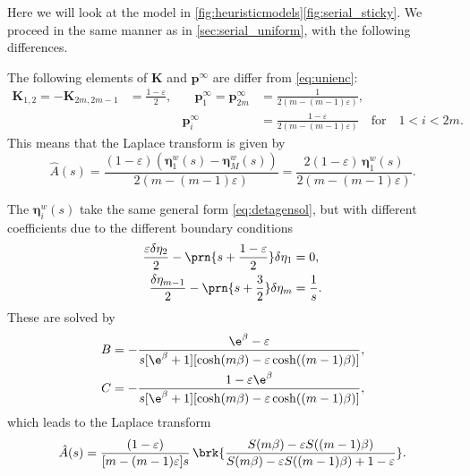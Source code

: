 \documentclass[12pt]{article}
\newcommand{\pr}{\mathbf{p}}
\newcommand{\eq}{\pr^\infty}
\newcommand{\etw}{\boldsymbol{\eta}^w}
\newcommand{\enc}{\mathbf{K}}
\begin{document}
Here we will look at the model in \autoref{fig:heuristicmodels}\ref{fig:serial_sticky}.
We proceed in the same manner as in \autoref{sec:serial_uniform}, with the following differences.

The following elements of $\enc$ and $\eq$ are differ from \eqref{eq:unienc}:
%
\begin{equation}\label{eq:stickyenc}
  \begin{aligned}
  \enc_{1,2} = -\enc_{2m,2m-1} &= \frac{1-\varepsilon}{2},
  &\quad
  \eq_1 = \eq_{2m} &= \frac{1}{2(m-(m-1)\varepsilon)},
  \\ &&
  \eq_i &=  \frac{1-\varepsilon}{2(m-(m-1)\varepsilon)}
  \quad\text{for}\quad 1<i<2m.
  \end{aligned}
\end{equation}
%
This means that the Laplace transform is given by
%
\begin{equation}\label{eq:stickyareaeta}
  \hat{A}(s) = \frac{(1-\varepsilon)(\etw_1(s)-\etw_M(s))}
                    {2(m-(m-1)\varepsilon)}
       = \frac{2(1-\varepsilon)\, \etw_1(s)}{2(m-(m-1)\varepsilon)}.
\end{equation}
%

The $\etw_i(s)$ take the same general form \eqref{eq:detagensol}, but with different coefficients due to the different boundary conditions
%
\begin{equation}\label{eq:detabndsticky}
\begin{aligned}
  \frac{\varepsilon\delta\eta_2}{2} - \prn{s+\frac{1-\varepsilon}{2}}\delta\eta_1 &= 0, \\
  \frac{\delta\eta_{m-1}}{2} - \prn{s+\frac{3}{2}}\delta\eta_{m} &= \frac{1}{s}.
\end{aligned}
\end{equation}
%
These are solved by
%
\begin{equation}\label{eq:stickycoeffs}
\begin{aligned}
  B &= -\frac{\e^{\beta} - \varepsilon}
      {s [\e^{\beta} + 1] [\cosh(m\beta) - \varepsilon \cosh((m-1)\beta)]}, \\
  C &= -\frac{1 - \varepsilon\e^{\beta}}
      {s [\e^{\beta} + 1] [\cosh(m\beta) - \varepsilon \cosh((m-1)\beta)]},
\end{aligned}
\end{equation}
%
which leads to the Laplace transform
%
\begin{equation}\label{eq:stickylaplace}
  \hat{A}(s) = \frac{(1-\varepsilon)}{[m-(m-1)\varepsilon]s} \,
      \brk{\frac{S(m\beta) - \varepsilon S((m-1)\beta)}
      {S(m\beta) - \varepsilon S((m-1)\beta) + 1 - \varepsilon}}.
\end{equation}
%
\end{document}
